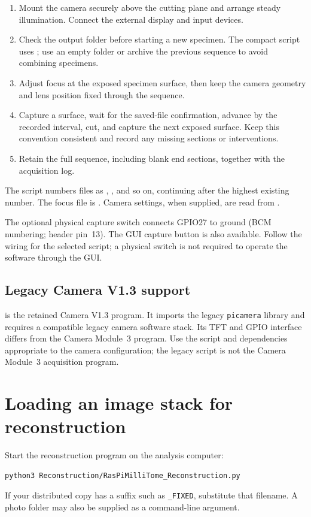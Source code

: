 \documentclass[11pt,a4paper]{article}
\begin{document}
\begin{enumerate}
\item Mount the camera securely above the cutting plane and arrange steady illumination. Connect the external display and input devices.
\item Check the output folder before starting a new specimen. The compact script uses ; use an empty folder or archive the previous sequence to avoid combining specimens.
\item Adjust focus at the exposed specimen surface, then keep the camera geometry and lens position fixed through the sequence.
\item Capture a surface, wait for the saved-file confirmation, advance by the recorded interval, cut, and capture the next exposed surface. Keep this convention consistent and record any missing sections or interventions.
\item Retain the full sequence, including blank end sections, together with the acquisition log.
\end{enumerate}
The script numbers files as , , and so on, continuing after the highest existing number. The focus file is . Camera settings, when supplied, are read from .

The optional physical capture switch connects GPIO27 to ground (BCM numbering; header pin~13). The GUI capture button is also available. Follow the wiring for the selected script; a physical switch is not required to operate the software through the GUI.

\subsection{Legacy Camera V1.3 support}
 is the retained Camera V1.3 program. It imports the legacy \texttt{picamera} library and requires a compatible legacy camera software stack. Its TFT and GPIO interface differs from the Camera Module~3 program. Use the script and dependencies appropriate to the camera configuration; the legacy script is not the Camera Module~3 acquisition program.

\clearpage
\section{Loading an image stack for reconstruction}
Start the reconstruction program on the analysis computer:
\begin{lstlisting}
python3 Reconstruction/RasPiMilliTome_Reconstruction.py
\end{lstlisting}
If your distributed copy has a suffix such as \texttt{\_FIXED}, substitute that filename. A photo folder may also be supplied as a command-line argument.
\end{document}
